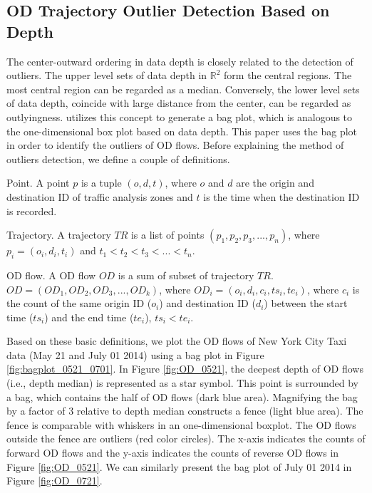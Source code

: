 \documentclass[a4paper,UKenglish]{lipics-v2016}
\begin{document}
\subsection{OD Trajectory Outlier Detection Based on Depth}
The center-outward ordering in data depth is closely related to the detection of outliers. The upper level sets of data depth in $\mathbb{R}^2$ form the central regions. The most central region can be regarded as a median. Conversely, the lower level sets of data depth, coincide with large distance from the center, can be regarded as outlyingness. \cite{rousseeuw99AS,aplpackR} utilizes this concept to generate a bag plot, which is analogous to the one-dimensional box plot based on data depth. This paper uses the bag plot in order to identify the outliers of OD flows. Before explaining the method of outliers detection, we define a couple of definitions.

\begin{definition}{Point.}
	A point $p$ is a tuple $(o,d,t)$, where $o$ and $d$  are the origin and destination ID of  traffic analysis zones and $t$ is the time when the destination ID is recorded.
\end{definition}


\begin{definition}{Trajectory.}
	A trajectory $TR$ is a list of points $(p_1, p_2, p_3,...,p_n)$, where $p_i = (o_i,d_i,t_i)$ and $t_1<t_2<t_3<...<t_n$.
\end{definition}

\begin{definition}{OD flow.}
	A OD flow $OD$ is a sum of subset of trajectory $TR$. $OD = (OD_1, OD_2, OD_3,...,OD_k)$, where $OD_i = (o_i,d_i,c_i,ts_i, te_i)$, where $c_i$ is the count of the same origin ID ($o_i$) and destination ID ($d_i$) between the start time ($ts_i$) and the end time ($te_i$), $ts_i<te_i$.
\end{definition}

Based on these basic definitions, we plot the OD flows of New York City Taxi data (May 21 and July 01 2014) using a bag plot in Figure \ref{fig:bagplot_0521_0701}. In Figure \ref{fig:OD_0521}, the deepest depth of OD flows (i.e., depth median) is represented as a star symbol. This point is surrounded by a bag, which contains the half of OD flows (dark blue area). Magnifying the bag by a factor of 3 relative to depth median constructs a fence (light blue area). The fence is comparable with whiskers in an one-dimensional boxplot. The OD flows outside the fence are outliers (red color circles). The x-axis indicates the counts of forward OD flows and the y-axis indicates  the counts of reverse OD flows in Figure \ref{fig:OD_0521}. We can similarly present the bag plot of July 01 2014 in Figure \ref{fig:OD_0721}.
\end{document}
